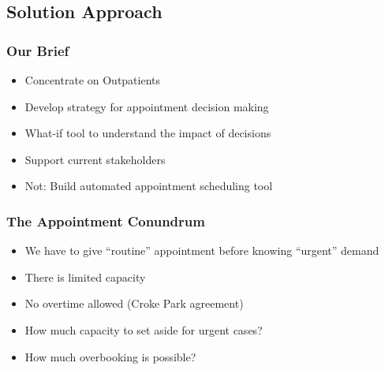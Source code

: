 
\subsection{Solution Approach}

\begin{frame}
\frametitle{Our Brief}
\begin{itemize}
\item Concentrate on Outpatients
\item Develop strategy for appointment decision making
\item What-if tool to understand the impact of decisions
\item Support current stakeholders
\item Not: Build automated appointment scheduling tool
\end{itemize}
\end{frame}



\begin{frame}
\frametitle{The Appointment Conundrum}
\begin{itemize}
\item We have to give ``routine'' appointment before knowing ``urgent'' demand
\item There is limited capacity
\item No overtime allowed (Croke Park agreement)
\item How much capacity to set aside for urgent cases?
\item How much overbooking is possible?
\end{itemize}
\end{frame}

